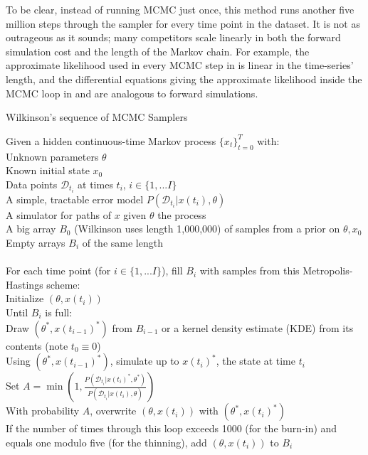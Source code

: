 \documentclass{article}
\begin{document}
To be clear, instead of running MCMC just once, this method runs another five million steps through the sampler for every time point in the dataset. It is not as outrageous as it sounds; many competitors scale linearly in both the forward simulation cost and the length of the Markov chain. %
For example, the approximate likelihood used in every MCMC step in \cite{golightly2011bayesian} is linear in the time-series' length, and the differential equations giving the approximate likelihood inside the MCMC loop in \cite{milner2013moment} and \cite{zechner2012moment} are analogous to forward simulations.

\begin{algorithm}[h]
\caption{ \label{pMCMC} Wilkinson's sequence of MCMC Samplers}
Given a hidden continuous-time Markov process $\{x_t\}_{t=0}^T$ with: \\
\Indp \Indp
Unknown parameters $\theta$\\
Known initial state $x_0$\\
Data points $\mathcal{D}_{t_{i}}$ at times $t_{i}$, $i \in \{1, ... I\}$ \\
A simple, tractable error model $P(\mathcal{D}_{t_{i}}|x(t_{i}), \theta)$\\
A simulator for paths of $x$ given $\theta$ the process\\
A big array $B_0$ (Wilkinson uses length 1,000,000) of samples from a prior on $\theta, x_0$\\
Empty arrays $B_{i}$ of the same length\\
$\phantom{0}$\\
\Indm \Indm
For each time point (for $i \in \{1, ... I\}$), fill $B_{i}$ with samples from this Metropolis-Hastings scheme:\\
\Indp\Indp
Initialize $(\theta, x(t_{i}))$ \\
Until $B_{i}$ is full: \\
\Indp\Indp
Draw $(\theta^*, x(t_{i-1})^*)$ from $B_{i-1}$ or a kernel density estimate (KDE) from its contents (note $t_0\equiv0$)\\
Using $(\theta^*, x(t_{i-1})^*)$, simulate up to $x(t_{i})^*$, the state at time $t_{i}$ \\
Set $A=\min(1, \frac{P(\mathcal{D}_{t_{i}}|x(t_{i})^*, \theta^*)}{P(\mathcal{D}_{t_{i}}|x(t_{i}), \theta)})$\\
With probability $A$, overwrite $(\theta, x(t_{i}))$ with $(\theta^*, x(t_{i})^*)$\\
If the number of times through this loop exceeds 1000 (for the burn-in) and equals one modulo five (for the thinning), add $(\theta, x(t_{i}))$ to $B_{i}$\\
\Indm \Indm
\end{algorithm}
\pagebreak
\end{document}

